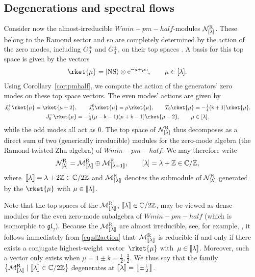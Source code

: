 \documentclass[10pt,a4paper]{amsart}
\numberwithin{equation}{section}
\newcommand{\bG}{\bar{G}{}}
\newcommand{\ee}{\mathrm{e}} %
\newcommand{\kk}{\mathsf{k}} %
\newcommand{\NS}{\textnormal{NS}}
\newcommand{\R}{\textnormal{R}}
\DeclarePairedDelimiter{\dbrac}{\llbracket}{\rrbracket} %
\DeclarePairedDelimiter{\ket}{\lvert}{\rangle}
\newcommand{\fld}[1]{\mathbb{#1}} %
\newcommand{\alg}[1]{\mathfrak{#1}} %
\newcommand{\VOA}[1]{\mathsf{#1}} %
\newcommand{\Mod}[1]{\mathcal{#1}} %
\newcommand{\ZZ}{\fld{Z}}
\newcommand{\CC}{\fld{C}}
\newcommand{\SLA}[2]{\alg{#1}_{#2}} %
\newcommand{\gltwo}{\SLA{gl}{2}}
\newcommand{\swalg}[2]{\VOA{W}_{#1}^{\mathrm{#2}}} %
\newcommand{\smin}[1][\kk]{\swalg{#1}{min}} %
\newcommand{\sminpmhalf}{\smin[\pm 1/2]}
\newcommand{\sfnsvac}{\ket{\NS}} %
\newcommand{\nrind}[1]{\Mod{N}^{\R}_{[#1]}}
\newcommand{\nrrel}[1]{\Mod{M}^{\R}_{\vphantom{[#1]}\smash{\dbrac{#1}}}}
\newcommand{\chw}{conjugate highest-weight}
\newcommand{\chwv}{\chw\ vector}
\def\smash#1{#1}
\def\sminpmhalf{Wmin-pm-half}
\begin{document}
\subsection{Degenerations and spectral flows} \label{sec:degsfk=+-1/2}

Consider now the almost-irreducible \smash{$\sminpmhalf{}$}-modules \smash{$\nrind{\lambda}$}.
These belong to the Ramond sector and so are completely determined by the action of the zero modes, including $G^{\pm}_0$ and $\bG^{\pm}_0$, on their top spaces \cite{DeSFin05}.
A basis for this top space is given by the vectors
\begin{equation} \label{eq:defmuR}
	\rket{\mu} = \sfnsvac \otimes \ee^{-a+\mu c}, \qquad \mu \in [\lambda].
\end{equation}
Using Corollary~\ref{cor:pmhalf}, we compute the action of the generators' zero modes on these top space vectors.
The even modes' actions are given by
\begin{gather}
		J^{+}_{0}\rket{\mu} = \rket{\mu+2}, \qquad
		J^{0}_{0}\rket{\mu} = \mu\rket{\mu}, \qquad
		T_{0}\rket{\mu} = -\tfrac{1}{4}(\kk+1) \rket{\mu}, \nonumber\\
		J^{-}_{0}\rket{\mu} = -\tfrac{1}{4}(\mu - \kk - 1)(\mu + \kk - 1)\rket{\mu-2},
	\qquad \mu \in [\lambda],\label{eq:sl2action}
\end{gather}
while the odd modes all act as $0$.
The top space of \smash{$\nrind{\lambda}$} thus decomposes as a direct sum of two (generically irreducible) modules for the zero-mode algebra (the Ramond-twisted Zhu algebra) of \smash{$\sminpmhalf$}.
We may therefore write
\[ \nrind{\lambda} = \nrrel{\lambda} \oplus \nrrel{\lambda+1},\qquad [\lambda] = \lambda+\ZZ \in \CC/\ZZ,\]
where~${\dbrac{\lambda} = \lambda+2\ZZ \in \CC/2\ZZ}$ and \smash{$\nrrel{\lambda}$} denotes the submodule of \smash{$\nrind{\lambda}$} generated by the \smash{$\rket{\mu}$} with $\mu \in \dbrac{\lambda}$.

Note that the top spaces of the \smash{$\nrrel{\lambda}$}, $\dbrac{\lambda} \in \CC/2\ZZ$, may be viewed as dense modules for the even zero-mode subalgebra of \smash{$\sminpmhalf$} (which is isomorphic to $\gltwo$).
Because the \smash{$\nrrel{\lambda}$} are almost irreducible, see, for example, \cite[Proposition~4.8]{FasMod24}, it follows immediately from \eqref{eq:sl2action} that~\smash{$\nrrel{\lambda}$} is reducible if and only if there exists a \chwv\ $\rket{\mu}$ with~${\mu \in \dbrac{\lambda}}$.
Moreover, such a vector only exists when $\mu = 1\pm\kk = \frac{1}{2}, \frac{3}{2}$.
We thus say that the family $\smash{\bigl\{\nrrel{\lambda} \mid \dbrac{\lambda} \in \CC/2\ZZ}\bigr\}$ degenerates at $\dbrac{\lambda} = \dbrac[\big]{\pm\frac{1}{2}}$.
\end{document}
